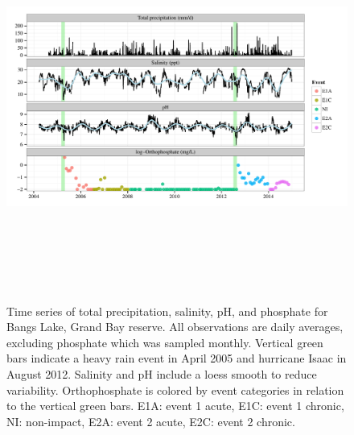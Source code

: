 \documentclass[letterpaper,12pt]{article}\usepackage[]{graphicx}\usepackage[]{color}
\makeatletter
\def\maxwidth{ %
  \ifdim\Gin@nat@width>\linewidth
    \linewidth
  \else
    \Gin@nat@width
  \fi
}
\makeatother
\begin{document}

\begin{landscape}
\centering\vspace*{\fill}
\begin{figure}[!ht]

{\centering \includegraphics[width=\maxwidth,height=5in]{figs/tsplot-1} 

}

\caption[Time series of total precipitation, salinity, pH, and phosphate for Bangs Lake, Grand Bay reserve]{Time series of total precipitation, salinity, pH, and phosphate for Bangs Lake, Grand Bay reserve.  All observations are daily averages, excluding phosphate which was sampled monthly.  Vertical green bars indicate a heavy rain event in April 2005 and hurricane Isaac in August 2012.  Salinity and pH include a loess smooth to reduce variability. Orthophosphate is colored by event categories in relation to the vertical green bars.  E1A: event 1 acute, E1C: event 1 chronic, NI: non-impact, E2A: event 2 acute, E2C: event 2 chronic.}\label{fig:tsplot}
\end{figure}


\end{landscape}
\clearpage
\end{document}
